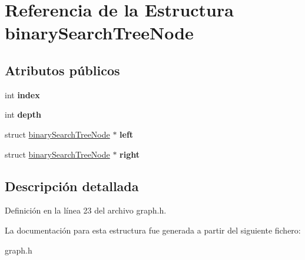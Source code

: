 \hypertarget{structbinary_search_tree_node}{}\section{Referencia de la Estructura binary\+Search\+Tree\+Node}
\label{structbinary_search_tree_node}
\subsection*{Atributos públicos}
\begin{DoxyCompactItemize}
\item 
\mbox{\label{structbinary_search_tree_node_a4e0f8cba2bfc80d0de267a3591820f98}} 
int {\bfseries index}
\item 
\mbox{\label{structbinary_search_tree_node_a5845e52d2f0e9f9b333979a76b24175e}} 
int {\bfseries depth}
\item 
\mbox{\label{structbinary_search_tree_node_a68c39e822e3297f31792198b6da65a50}} 
struct \hyperlink{structbinary_search_tree_node}{binary\+Search\+Tree\+Node} $\ast$ {\bfseries left}
\item 
\mbox{\label{structbinary_search_tree_node_acdf378dfde2f507a7c7a6babb9cdccb0}} 
struct \hyperlink{structbinary_search_tree_node}{binary\+Search\+Tree\+Node} $\ast$ {\bfseries right}
\end{DoxyCompactItemize}


\subsection{Descripción detallada}


Definición en la línea 23 del archivo graph.\+h.



La documentación para esta estructura fue generada a partir del siguiente fichero\+:\begin{DoxyCompactItemize}
\item 
graph.\+h\end{DoxyCompactItemize}
